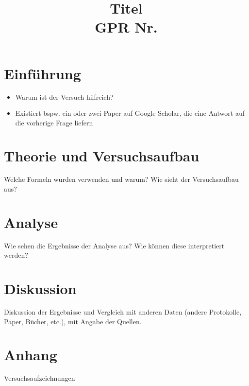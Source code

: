 \documentclass[bibliography=totocnumbered]{scrartcl}
\title{\Huge Titel\\
    \huge \ac{GPR} Nr.
}
\begin{document}
    \renewcommand{\abstractname}{Abstract} %
    
    \tableofcontents
    \listoffigures
    \listoftables
    
    \newpage
    \section{Einführung}
        \begin{itemize}
            \item Warum ist der Versuch hilfreich?
            \item Existiert \ac{bspw.} ein oder zwei Paper auf Google Scholar, die eine Antwort auf die vorherige Frage liefern
        \end{itemize}
    \section{Theorie und Versuchsaufbau}
        Welche Formeln wurden verwenden und warum? Wie sieht der Versuchsaufbau aus?
    \section{Analyse}
        Wie sehen die Ergebnisse der Analyse aus? Wie können diese interpretiert werden?
    \section{Diskussion}
        Diskussion der Ergebnisse und Vergleich mit anderen Daten (andere Protokolle, Paper, Bücher, \ac{etc.}), mit Angabe der Quellen.

    \newpage
    \appendix
    \section{Anhang}
    Versuchsaufzeichnungen
    \newpage
    \printbibliography[title={Literatur}]
\end{document}
